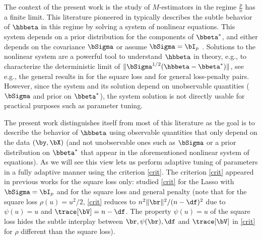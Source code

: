 \documentclass{colt2022} %
\numberwithin{equation}{section}
\begin{document}
The context of the present work is the study of $M$-estimators
in the regime $\frac pn$ has a finite limit. This literature pioneered
in \cite{bayati2012lasso,karoui2013robust,donoho2016high,stojnic2013framework}
typically describes the subtle behavior of $\hbbeta$ in this regime by solving a system of nonlinear equations.
This system %
depends
on a prior distribution for the components of $\bbeta^*$,
and either depends on the covariance $\bSigma$ 
\citep{celentano2020lasso,dobriban2018high}
or assume $\bSigma=\bI_p$
\cite[among many others]{bayati2012lasso,thrampoulidis2018precise,celentano2019fundamental}.
Solutions to the nonlinear system are a powerful tool to understand
$\hbbeta$ in theory, e.g., to characterize the deterministic
limit of $\|\bSigma^{1/2}(\hbbeta-\bbeta^*)\|$, see e.g.,
the general results in 
\cite{celentano2019fundamental} for the square loss
and \cite{thrampoulidis2018precise} for general loss-penalty pairs.
However, since the system
and its solution depend on unobservable quantities
($\bSigma$ and prior on $\bbeta^*$), the system solution is not directly usable
for practical purposes such as parameter tuning.

The present work distinguishes itself from most of this literature
as the goal is to describe the behavior of $\hbbeta$
using observable quantities that only depend on the data $(\by,\bX)$
(and not unobservable ones such as $\bSigma$ or a prior 
distribution on $\bbeta^*$ that appear in the aforementioned nonlinear system
of equations). As we will see this view lets us perform
adaptive tuning of parameters in a fully adaptive manner
using the criterion \eqref{crit}.
The criterion \eqref{crit} appeared in previous works for the square loss
only: \cite{bayati2013estimating,miolane2018distribution} studied
\eqref{crit} for the Lasso with $\bSigma=\bI_p$
and \cite[Section 3]{bellec2020out_of_sample} for the square loss and general
penalty (note that for the square loss $\rho(u)=u^2/2$,
\eqref{crit} reduces to $n^{2}\|\br\|^2/(n-\df)^2$
due to $\psi(u)=u$ and $\trace[\bV]=n-\df$.
The property $\psi(u)=u$ of the square loss
hides the subtle interplay between $\br,\psi(\br),\df$ and $\trace[\bV]$
in \eqref{crit} for $\rho$ different than the square loss).
\end{document}
